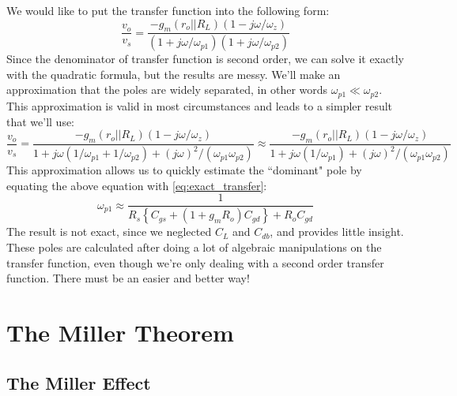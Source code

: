 We would like to put the transfer function into the following form:
%
\begin{equation}
\frac{v_{o}}{v_{s}} = 
	\frac{ - g_m \left( r_o||R_L \right) \left( 1 - j\omega /\omega_z \right)}
	{\left( 1 + j\omega /\omega_{p1} \right) \left( 1 + j\omega /\omega_{p2} \right) }
\end{equation}
%
Since the denominator of transfer function is second order, we can solve it exactly with the quadratic formula, but the results are messy.  We'll make an approximation that the poles are widely separated, in other words $\omega_{p1} \ll \omega_{p2}$.  This approximation is valid in most circumstances and leads to a simpler result that we'll use:
%
\begin{equation}
\frac{v_{o}}{v_{s}} = 
	\frac{ - g_m \left( r_o||R_L \right) \left( 1 - j\omega /\omega_z \right)}
	{ 1 + j\omega \left( 1/\omega_{p1} +  1/\omega_{p2} \right) + (j\omega)^2 / (\omega_{p1}\omega_{p2})   }
	\approx 
	\frac{ - g_m \left( r_o||R_L \right) \left( 1 - j\omega /\omega_z \right)}
	{ 1 + j\omega \left( 1/\omega_{p1}  \right) + (j\omega)^2 / (\omega_{p1}\omega_{p2})   }
\end{equation}
%
This approximation allows us to quickly estimate the ``dominant" pole by equating the above equation with \ref{eq:exact_transfer}:
%
\begin{equation} 
{\omega _{p1}} \approx \frac{1}{{{R_s}\left\{ {{C_{gs}} + \left( {1 + {g_m}{{R}_{o}}} \right){C_{gd}}} \right\} + {{R}_{o}}{C_{gd}}}}  \label{eq:pole_almost_exact}
\end{equation}
%
The result is not exact, since we neglected $C_L$ and $C_{db}$, and provides little insight.  These poles are calculated after doing a lot of algebraic manipulations on the transfer function, even though we're only dealing with a second order transfer function. There must be an easier and better way!
 

\section{The Miller Theorem}

\subsection{The Miller Effect}

